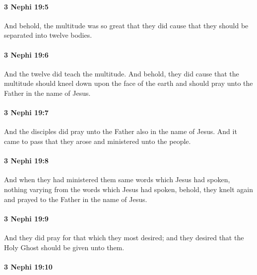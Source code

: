 		\paragraph{3 Nephi 19:5} %
			\label{3NEPHI-19-5}

			And behold, the multitude was so great
			that they did cause that they should be separated into twelve bodies.

		\paragraph{3 Nephi 19:6} %
			\label{3NEPHI-19-6}

			And the twelve did teach the multitude.
			And behold, they did cause
			that the multitude should kneel down upon the face of the earth
			and should pray unto the Father in the name of Jesus.

		\paragraph{3 Nephi 19:7} %
			\label{3NEPHI-19-7}

			And the disciples did pray unto the Father also in the name of Jesus.
			And it came to pass that they arose and ministered unto the people.

		\paragraph{3 Nephi 19:8} %
			\label{3NEPHI-19-8}

			And when they had ministered
			them same words which Jesus had spoken,
			nothing varying from the words which Jesus had spoken,
			behold, they knelt again and prayed to the Father in the name of Jesus.

		\paragraph{3 Nephi 19:9} %
			\label{3NEPHI-19-9}

			And they did pray for that which they most desired;
			and they desired that the Holy Ghost should be given unto them.

		\paragraph{3 Nephi 19:10} %
			\label{3NEPHI-19-10}


